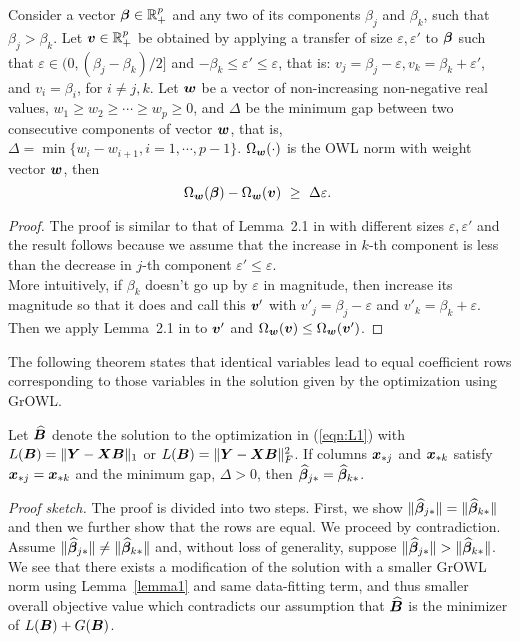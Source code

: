 \begin{lemma}\label{lemma1}
Consider a vector $\boldsymbol{\beta} \in {\mathbb R}^p_+$ and any two of its components $\beta_j$ and $\beta_k$, such that $\beta_j > \beta_k$. Let $\boldsymbol{v} \in {\mathbb R}^p_+$ be obtained by applying a transfer of size $\varepsilon, \varepsilon'$ to $\boldsymbol{\beta}$ such that $\varepsilon \in (0, (\beta_j - \beta_k )/2]$ and $ -\beta_k \leq \varepsilon' \leq \varepsilon$, that is: $v_j = \beta_j - \varepsilon, v_k = \beta_k + \varepsilon'$, and $v_i = \beta_i$, for $i \neq j, k$. Let $\boldsymbol{w}$ be a vector of non-increasing non-negative real values, $w_1 \geq w_2 \geq \cdots \geq w_p \geq 0$, and $\Delta$ be the minimum gap between two consecutive components of vector
$\boldsymbol{w}$, that is, $\Delta = \min\{w_i - w_{i+1}, i = 1, \cdots, p - 1\}$. $\Omega_{\boldsymbol{w}}(\cdot)$ is the OWL norm with weight vector $\boldsymbol{w}$, then
$$\Omega_{\bw}(\bbeta) - \Omega_{\bw}(\bv) \ \geq \ \Delta \varepsilon. \ $$
\end{lemma}

\begin{proof}
The proof is similar to that of Lemma~2.1 in \cite{owl} with different sizes $\varepsilon, \varepsilon'$ and the result follows because we assume that the increase in $k$-th component is less than the decrease in $j$-th component \ie $\varepsilon' \leq \varepsilon$.\\
More intuitively, if $\beta_k$ doesn't go up by $\varepsilon$ in magnitude, then increase its magnitude so that it does and call this $\boldsymbol{v}'$ with $v'_j = \beta_j - \varepsilon$ and $v'_k = \beta_k + \varepsilon$.  Then we apply Lemma~2.1 in \cite{owl} to $\boldsymbol{v}'$ and $\Omega_{\boldsymbol{w}}(\boldsymbol{v}) \leq \Omega_{\boldsymbol{w}}(\boldsymbol{v}')$. 
\end{proof}

The following theorem states that identical variables lead to equal coefficient rows corresponding to those variables in the solution given by the optimization using GrOWL.

\begin{theorem}\label{ident1}
Let $\widehat {\boldsymbol{B}}$ denote the solution to the optimization in (\ref{eqn:L1}) with $L(\boldsymbol{B}) = \|\boldsymbol{Y} - \boldsymbol{X} \boldsymbol{B} \|_1$ or $L(\boldsymbol{B}) = \|\boldsymbol{Y} - \boldsymbol{X} \boldsymbol{B} \|_F^2$.
If columns $\boldsymbol{x}_{{\ast} j}$ and $\boldsymbol{x}_{{\ast} k}$ satisfy $\boldsymbol{x}_{{\ast} j} = \boldsymbol{x}_{{\ast} k}$ and the minimum gap, $\Delta > 0$, then
$\widehat {\boldsymbol{\beta}}_{j {\ast}} = \widehat {\boldsymbol{\beta}}_{k {\ast}}$.
\end{theorem}

\textit{Proof sketch.}
The proof is divided into two steps. First, we show $\|\widehat {\boldsymbol{\beta}}_{j {\ast}}\| = \|\widehat {\boldsymbol{\beta}}_{k {\ast}}\|$ and then we further show that the rows are equal. 
We proceed by contradiction. Assume $\|\widehat {\boldsymbol{\beta}}_{j {\ast}}\| \neq \|\widehat {\boldsymbol{\beta}}_{k {\ast}}\|$ and, without loss of generality, suppose $\|\widehat {\boldsymbol{\beta}}_{j {\ast}}\| > \|\widehat {\boldsymbol{\beta}}_{k {\ast}}\|$. We see that there exists a modification of the solution with a smaller GrOWL norm using Lemma~\ref{lemma1} and same data-fitting term, and thus smaller overall objective value which contradicts our assumption that $\widehat {\boldsymbol{B}}$ is the minimizer of $L(\boldsymbol{B}) + G(\boldsymbol{B})$. \\

